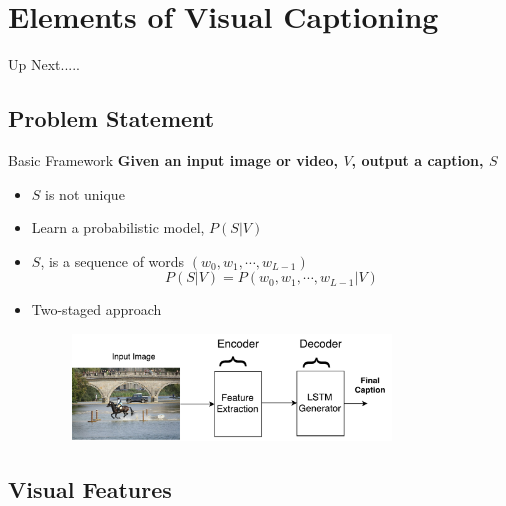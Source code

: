 \documentclass{beamer}
\begin{document}
\section{Elements of Visual Captioning}
\begin{frame}{Up Next.....}
\tableofcontents[currentsection] 
\end{frame}
\subsection{Problem Statement}
\begin{frame}{Basic Framework}
\textbf{Given an input image or video, $V$, output a caption, $S$}
\begin{itemize}
\item $S$ is not unique
\item Learn a probabilistic model, $P(S|V)$
\item $S$, is a sequence of words $(w_0, w_1,\cdots, w_{L-1})$
\begin{equation}
\label{eq:langB1} P(S|V) = P(w_0, w_1, \cdots, w_{L-1}|V)
\end{equation}
\item Two-staged approach
    {
        \begin{figure}[h]
            \centering
            \includegraphics[width=0.8\textwidth]{images/EncDec.pdf}
        \end{figure}
     }
\end{itemize} 
\end{frame}
\subsection{Visual Features}
\end{document}
